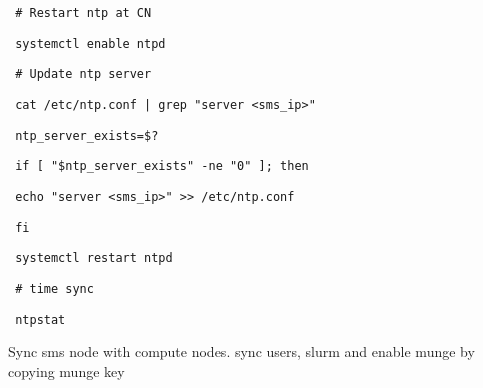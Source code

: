 \documentclass[12pt]{article}
\begin{document}
\begin{bash}\texttt{\small{ \# Restart ntp at CN}}\end{bash}
\begin{bash}\texttt{\small{ systemctl enable ntpd}}\end{bash}
\begin{bash}\texttt{\small{ \# Update ntp server}}\end{bash}
\begin{bash}\texttt{\small{ cat /etc/ntp.conf | grep "server <sms\_ip>"}}\end{bash}
\begin{bash}\texttt{\small{ ntp\_server\_exists=\$?}}\end{bash}
\begin{bash}\texttt{\small{ if [ "\${ntp\_server\_exists}" -ne "0" ]; then}}\end{bash}
\begin{bash}\texttt{\small{     echo "server <sms\_ip>" >> /etc/ntp.conf}}\end{bash}
\begin{bash}\texttt{\small{ fi}}\end{bash}
\begin{bash}\texttt{\small{ systemctl restart ntpd}}\end{bash}
\begin{bash}\texttt{\small{ \# time sync}}\end{bash}
\begin{bash}\texttt{\small{ ntpstat}}\end{bash}

Sync sms node with compute nodes. sync users, slurm and enable munge by copying munge key
\end{document}
